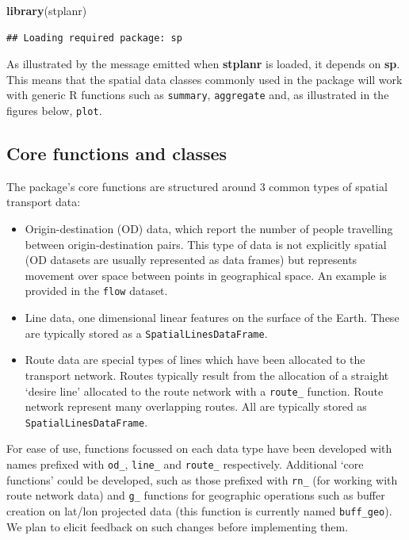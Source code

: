 \documentclass[11pt]{article}
\providecommand{\tightlist}{%
  \setlength{\itemsep}{0pt}\setlength{\parskip}{0pt}}
\newenvironment{Shaded}{\begin{snugshade}}{\end{snugshade}}
\newcommand{\KeywordTok}[1]{\textcolor[rgb]{0.13,0.29,0.53}{\textbf{{#1}}}}
\newcommand{\NormalTok}[1]{{#1}}
\begin{document}
\begin{Shaded}
\begin{Highlighting}[]
\KeywordTok{library}\NormalTok{(stplanr)}
\end{Highlighting}
\end{Shaded}

\begin{verbatim}
## Loading required package: sp
\end{verbatim}

As illustrated by the message emitted when \textbf{stplanr} is loaded,
it depends on \textbf{sp}. This means that the spatial data classes
commonly used in the package will work with generic R functions such as
\texttt{summary}, \texttt{aggregate} and, as illustrated in the figures
below, \texttt{plot}.

\subsection{Core functions and
classes}\label{core-functions-and-classes}

The package's core functions are structured around 3 common types of
spatial transport data:

\begin{itemize}
\tightlist
\item
  Origin-destination (OD) data, which report the number of people
  travelling between origin-destination pairs. This type of data is not
  explicitly spatial (OD datasets are usually represented as data
  frames) but represents movement over space between points in
  geographical space. An example is provided in the \texttt{flow}
  dataset.
\item
  Line data, one dimensional linear features on the surface of the
  Earth. These are typically stored as a \texttt{SpatialLinesDataFrame}.
\item
  Route data are special types of lines which have been allocated to the
  transport network. Routes typically result from the allocation of a
  straight `desire line' allocated to the route network with a
  \texttt{route\_} function. Route network represent many overlapping
  routes. All are typically stored as \texttt{SpatialLinesDataFrame}.
\end{itemize}

For ease of use, functions focussed on each data type have been
developed with names prefixed with \texttt{od\_}, \texttt{line\_} and
\texttt{route\_} respectively. Additional `core functions' could be
developed, such as those prefixed with \texttt{rn\_} (for working with
route network data) and \texttt{g\_} functions for geographic operations
such as buffer creation on lat/lon projected data (this function is
currently named \texttt{buff\_geo}). We plan to elicit feedback on such
changes before implementing them.
\end{document}
